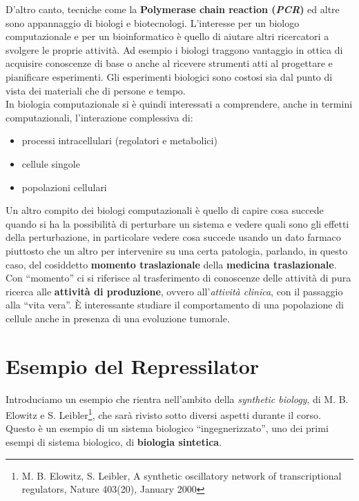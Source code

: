 \documentclass[a4paper,12pt, oneside]{book}
\begin{document}
D'altro canto, tecniche come la \textbf{Polymerase chain reaction
  (\textit{PCR})} ed altre sono appannaggio di biologi e biotecnologi.
L'interesse per un biologo computazionale e per un bioinformatico è quello di
aiutare altri ricercatori a svolgere le proprie attività. Ad esempio i biologi
traggono vantaggio in ottica di acquisire conoscenze di base o anche al ricevere
strumenti atti al progettare e pianificare esperimenti. Gli esperimenti
biologici sono costosi sia dal punto di vista dei materiali che di persone e
tempo. \\
In biologia computazionale si è quindi interessati a comprendere, anche in
termini computazionali, l'interazione complessiva di:
\begin{itemize}
  \item processi intracellulari (regolatori e metabolici)
  \item cellule singole
  \item popolazioni cellulari 
\end{itemize}
Un altro compito dei biologi computazionali è quello di capire cosa
succede quando si ha la possibilità di perturbare un sistema e vedere quali sono
gli effetti della perturbazione, in particolare vedere cosa succede usando un
dato farmaco piuttosto che un altro per intervenire su una certa patologia,
parlando, in questo caso, del cosiddetto \textbf{momento traslazionale} della
\textbf{medicina traslazionale}. Con ``momento'' ci si riferisce al
trasferimento di conoscenze delle attività di pura ricerca alle \textbf{attività
  di produzione}, ovvero all'\textit{attività clinica}, con il passaggio alla
``vita vera''. È interessante studiare il comportamento di una popolazione di
cellule anche in presenza di una evoluzione tumorale.
\chapter{Esempio del Repressilator}
Introduciamo un esempio che rientra nell'ambito della \textit{synthetic
  biology}, di M. B. Elowitz e S. Leibler\footnote{M. B. Elowitz, 
  S. Leibler, A synthetic oscillatory network of transcriptional regulators,
  Nature 403(20), January 2000},  che sarà rivisto sotto diversi aspetti durante
il corso. Questo è un esempio di un sistema biologico ``ingegnerizzato'', uno
dei primi esempi di sistema biologico, di \textbf{biologia sintetica}.
\end{document}
